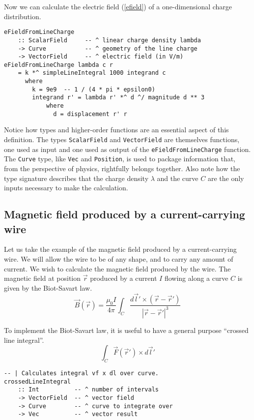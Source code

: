 \documentclass{eptcs}
\newcommand{\abs}[1]{\left| #1 \right|}
\begin{document}
Now we can calculate the electric field (\ref{efield}) of a one-dimensional charge distribution.
\begin{verbatim}
eFieldFromLineCharge
    :: ScalarField     -- ^ linear charge density lambda
    -> Curve           -- ^ geometry of the line charge
    -> VectorField     -- ^ electric field (in V/m)
eFieldFromLineCharge lambda c r
    = k *^ simpleLineIntegral 1000 integrand c
      where
        k = 9e9  -- 1 / (4 * pi * epsilon0)
        integrand r' = lambda r' *^ d ^/ magnitude d ** 3
            where
              d = displacement r' r
\end{verbatim}

Notice how types and higher-order functions are an essential aspect of
this definition.  The types \verb|ScalarField| and \verb|VectorField|
are themselves functions, one used as input and one used as output
of the \verb|eFieldFromLineCharge| function.  The \verb|Curve|
type, like \verb|Vec| and \verb|Position|, is used to package
information that, from the perspective of physics, rightfully
belongs together.
Also note how the type signature describes that the charge density
$\lambda$ and the curve $C$ are the only inputs necessary to make the
calculation.

\subsection{Magnetic field produced by a current-carrying wire}

Let us take the example of the magnetic field produced by
a current-carrying wire.  We will allow the wire to be of any
shape, and to carry any amount of current.  We wish to calculate
the magnetic field produced by the wire.
The magnetic field at position $\vec{r}$ produced by a current $I$ flowing along a curve $C$ is
given by the Biot-Savart law.
\begin{equation}
\vec{B}(\vec{r}) = \frac{\mu_0 I}{4 \pi} \int_C \frac{d\vec{l}' \times (\vec{r} - \vec{r}')}{\abs{\vec{r} - \vec{r}'}^3}
\label{biotsavart}
\end{equation}

To implement the Biot-Savart law, it is useful to have a
general purpose ``crossed line integral''.
\[
\int_C \vec{F}(\vec{r}') \times d\vec{l}'
\]
\begin{verbatim}
-- | Calculates integral vf x dl over curve.
crossedLineIntegral
    :: Int          -- ^ number of intervals
    -> VectorField  -- ^ vector field
    -> Curve        -- ^ curve to integrate over
    -> Vec          -- ^ vector result
\end{verbatim}
\end{document}

